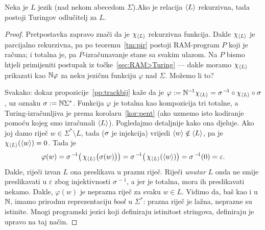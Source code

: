 \begin{teorem}[{name=[Turing-odlučivost rekurzivnog jezika]}]\label{tm:krio}
Neka je $L$ jezik (nad nekom abecedom $\Sigma$).\newline Ako je relacija $\langle L\rangle$ rekurzivna, tada postoji Turingov odlučitelj za $L$.
\end{teorem}
\begin{proof}
Pretpostavka zapravo znači da je $\chi_{\langle L\rangle}$ rekurzivna funkcija. Dakle $\chi_{\langle L\rangle}$ je parcijalno rekurzivna, pa po teoremu~\ref{tm:pir} postoji RAM-program $P$ koji je računa; i totalna je, pa $P$-izračunavanje stane sa svakim ulazom. Na $P$ bismo htjeli primijeniti postupak iz točke~\ref{sec:RAM>Turing} --- dakle moramo $\chi_{\langle L\rangle}$ prikazati kao ${\mathbb N}\varphi$ za neku jezičnu funkciju $\varphi$ nad $\Sigma$. Možemo li to?

	Svakako: dokaz propozicije~\ref{pp:trackbij} kaže da je $\varphi:={\mathbb N}^{-\mspace{-2mu}1}\chi_{\langle L\rangle}=\sigma^{\,-\!1}\circ\chi_{\langle L\rangle}\circ\sigma$, uz oznaku $\sigma:={\mathbb N}\Sigma^*$. Funkcija $\varphi$ je totalna kao kompozicija tri totalne, a Turing-izračunljiva je prema korolaru~\ref{kor:pent} (ako uzmemo isto kodiranje pomoću kojeg smo izračunali $\langle L\rangle$). Pogledajmo detaljnije kako ona djeluje.
Ako joj damo riječ $w\in\Sigma^*\setminus L$, tada ($\mspace{-1mu}\sigma$ je injekcija) vrijedi $\langle w\rangle\notin\langle L\rangle$, pa je $\chi_{\langle L\rangle}(\langle w\rangle)=0$. Tada je
\begin{equation}
    \varphi(w)=\sigma^{\,-\!1}\bigl(\,\chi_{\langle L\rangle}\bigl(\sigma(w)\bigr)\bigr)=\sigma^{\,-\!1}\bigl(\,\chi_{\langle L\rangle}(\langle w\rangle)\bigr)=\sigma^{\,-\!1}(0)=\varepsilon\text.
\end{equation}
Dakle, riječi izvan $L$ ona preslikava u praznu riječ. Riječi \emph{unutar} $L$ onda ne smije preslikavati u $\varepsilon$ zbog injektivnosti $\sigma^{\,-\!1}$, a jer je totalna, mora ih preslikavati nekamo. Dakle, $\varphi(w)$ je neprazna riječ za svaku $w\in L$. Vidimo da, baš kao i u ${\mathbb N}$, imamo prirodnu reprezentaciju $bool$ u $\Sigma^*$: prazna riječ je lažna, neprazne su istinite. Mnogi programski jezici koji definiraju istinitost stringova, definiraju je upravo na taj način.



\end{proof}
